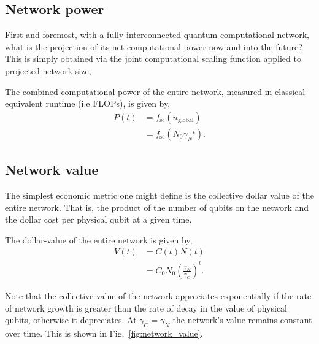 %
%

\subsection{Network power}\label{sec:network_power}

First and foremost, with a fully interconnected quantum computational network, what is the projection of its net computational power now and into the future? This is simply obtained via the joint computational scaling function applied to projected network size,

\begin{postulate}\label{post:network_power}
The combined computational power of the entire network, measured in classical-equivalent runtime (i.e FLOPs), is given by,
\begin{align}
P(t) &= f_\text{sc}(n_\text{global})\nonumber \\
&= f_\text{sc}(N_0{\gamma_N}^t).
\end{align}
\end{postulate}

%
%

\subsection{Network value}\label{sec:network_value}

The simplest economic metric one might define is the collective dollar value of the entire network. That is, the product of the number of qubits on the network and the dollar cost per physical qubit at a given time.

\begin{postulate}\label{post:network_value}
The dollar-value of the entire network is given by,
\begin{align}
	V(t) &= C(t) N(t) \nonumber \\
	&= C_0 N_0 \left(\frac{\gamma_N}{\gamma_C}\right)^t.
\end{align}
\end{postulate}

Note that the collective value of the network appreciates exponentially if the rate of network growth is greater than the rate of decay in the value of physical qubits, otherwise it depreciates. At \mbox{$\gamma_C=\gamma_N$} the network's value remains constant over time. This is shown in Fig.~\ref{fig:network_value}.

